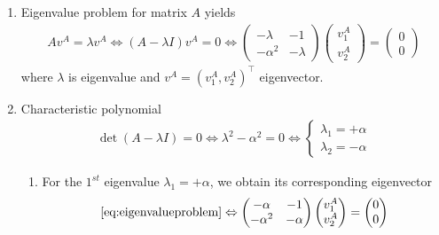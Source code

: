 \documentclass[12pt]{article}
\begin{document}
\begin{enumerate}
	\item Eigenvalue problem for matrix $A$ yields
	      \begin{align}\label{eq:eigenvalueproblem}
		      A
		      v^{A}
		      =\lambda
		      v^{A}
		      \Leftrightarrow
		      (A-\lambda I)v^{A}=0
		      \Leftrightarrow
		      \begin{pmatrix} -\lambda &-1\\-\alpha^2 & -\lambda \end{pmatrix}
		      \begin{pmatrix} v^{A}_{1} \\ v^{A}_{2} \end{pmatrix}
		      =
		      \begin{pmatrix} 0 \\ 0 \end{pmatrix}
	      \end{align}
	      where $\lambda$ is eigenvalue and $v^{A} = (v^{A}_{1},v^{A}_{2})^{\top}$ eigenvector.
	\item Characteristic polynomial
	      \begin{align}
		      \det(A-\lambda I) = 0 
		      \Leftrightarrow
		      \lambda^2 - \alpha^2 = 0 
		      \Leftrightarrow 
		      \begin{cases}
			      \lambda_{1}   = +\alpha \\
			      \lambda_{2}   = -\alpha
		      \end{cases}
	      \end{align}
	      \begin{enumerate}
		      \item For the $1^{st}$ eigenvalue $\lambda_{1} = +\alpha$, we obtain its corresponding eigenvector
		            \begin{align}
			            \eqref{eq:eigenvalueproblem}
			            \Leftrightarrow
			            \begin{pmatrix} -\alpha &-1\\-\alpha^2 & -\alpha \end{pmatrix}
			            \begin{pmatrix} v^{A}_{1} \\ v^{A}_{2} \end{pmatrix}
			            =
			            \begin{pmatrix} 0 \\ 0 \end{pmatrix}

\end{align}
\end{enumerate}
\end{enumerate}
\end{document}
